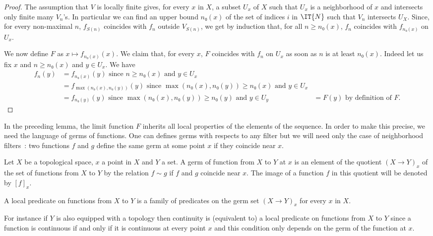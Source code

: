 \begin{proof}\leanok
  The assumption that $V$ is locally finite gives, for every $x$ in $X$, a
  subset $U_x$ of $X$ such that $U_x$ is a neighborhood of $x$ and intersects
  only finite many $V_n$'s. In particular we can find an upper bound $n₀(x)$ of the set
  of indices $i$ in $\IT{N}$ such that $V_n$ intersects $U_X$.
  Since, for every non-maximal $n$, $f_{S(n)}$ coincides with $f_n$ outside
  $V_{S(n)}$, we get by induction that, for all $n ≥ n₀(x)$, $f_n$ coincides
  with $f_{n₀(x)}$ on $U_x$.

  We now define $F$ as $x ↦ f_{n₀(x)}(x)$. We claim that, for every $x$,
  $F$ coincides with $f_n$ on $U_x$ as soon as $n$ is at least $n₀(x)$.
  Indeed let us fix $x$ and $n ≥ n₀(x)$ and $y ∈ U_x$. We have
  \begin{align*}
    f_n(y) &= f_{n₀(x)}(y) \text{ since $n ≥ n₀(x)$ and $y ∈ U_x$}\\
           &= f_{\max(n₀(x), n₀(y))}(y) \text{ since $\max(n₀(x), n₀(y)) ≥ n₀(x)$ and $y ∈ U_x$}\\
           &= f_{n₀(y)}(y) \text{ since $\max(n₀(x), n₀(y)) ≥ n₀(y)$ and $y ∈ U_y$}
           &= F(y) \text{ by definition of $F$}.
  \end{align*}
\end{proof}

In the preceding lemma, the limit function $F$ inherits all local properties of
the elements of the sequence. In order to make this precise, we need the
language of germs of functions. One can defines germs with respects to any filter but
we will need only the case of neighborhood filters~: two functions $f$ and $g$
define the same germ at some point $x$ if they coincide near $x$.

\begin{definition}\label{def:germ}\leanok
  Let $X$ be a topological space, $x$ a point in $X$ and $Y$ a set. A germ of function
  from $X$ to $Y$ at $x$ is an element of the quotient $(X → Y)_x$ of the set of functions
  from $X$ to $Y$ by the relation $f ∼ g$ if $f$ and $g$ coincide near $x$. The image
  of a function $f$ in this quotient will be denoted by $[f]_x$.

  A local predicate on functions from $X$ to $Y$ is a family of predicates on the
  germ set $(X → Y)_x$ for every $x$ in $X$.
\end{definition}

For instance if $Y$ is also equipped with a topology then continuity is
(equivalent to) a local predicate on functions from $X$ to $Y$ since a function
is continuous if and only if it is continuous at every point $x$ and this
condition only depends on the germ of the function at $x$.

